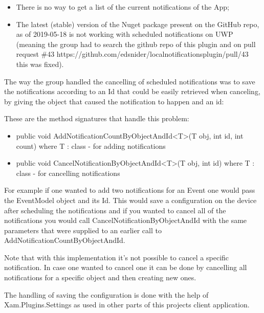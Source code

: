 \begin{itemize}
	\item There is no way to get a list of the current notifications of the App;
	
	\item The latest (stable) version of the Nuget package present on the GitHub repo, as of 2019-05-18 is not working with scheduled notifications on UWP (meaning the group had to search the github repo of this plugin and on pull request \#43 https://github.com/edsnider/localnotificationsplugin/pull/43 this was fixed).
	
	
\end{itemize}

\newpage

The way the group handled the cancelling of scheduled notifications was to save the notifications according to an Id that could be easily retrieved when canceling, by giving the object that caused the notification to happen and an id:

These are the method signatures that handle this problem:
\begin{itemize}
	\item public void AddNotificationCountByObjectAndId<T>(T obj, int id, int count)
	where T : class - for adding notifications
	
	\item public void CancelNotificationByObjectAndId<T>(T obj, int id)
	where T : class - for cancelling notifications
	
	
\end{itemize}


For example if one wanted to add two notifications for an Event one would pass the EventModel object and its Id. This would save a configuration on the device after scheduling the notifications and if you wanted to cancel all of the notifications you would call CancelNotificationByObjectAndId with the same parameters that were supplied to an earlier call to AddNotificationCountByObjectAndId.


Note that with this implementation it's not possible to cancel a specific notification. In case one wanted to cancel one it can be done by cancelling all notifications for a specific object and then creating new ones.

The handling of saving the configuration is done with the help of Xam.Plugins.Settings as used in other parts of this projects client application.

